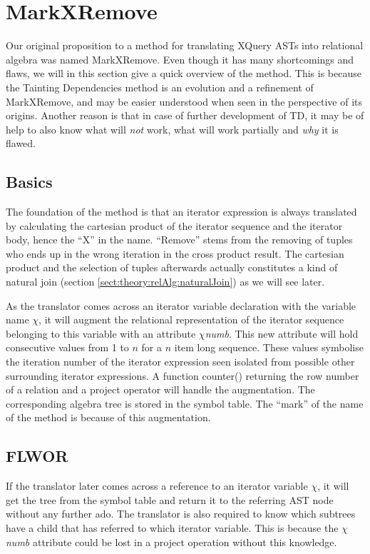 \section{MarkXRemove}
\label{sect:trans:MarkXRemove}

Our original proposition to a method for translating XQuery ASTs into relational algebra was named MarkXRemove.
Even though it has many
shortcomings and flaws, we will in this section give a quick overview of the
method. This is because the Tainting Dependencies method is an evolution
and a refinement of MarkXRemove, and may be easier understood when seen in the perspective of its origins. Another reason is that in case of further development of TD, it may be of help to also know what will
\textit{not} work, what will work partially and \textit{why} it is flawed.

\subsection{Basics}
\label{sect:trans:mxr:basics}

The foundation of the method is that an iterator expression is always translated by calculating the cartesian
product of the iterator sequence and the iterator body, hence the ``X'' in the name. ``Remove'' stems from the
removing of tuples who ends up in the wrong iteration in the cross product
result. The cartesian product and the selection of tuples afterwards actually constitutes a kind of natural join (section
\ref{sect:theory:relAlg:naturalJoin}) as we will see later.

As the translator comes across an iterator variable declaration with the variable name $\chi$, it will augment
the relational representation of the iterator sequence belonging to this variable with an attribute
$\chi$\textit{numb}. This new attribute will hold consecutive values from 1 to $n$ for a $n$ item long sequence.
These values symbolise the iteration number of the iterator expression seen isolated from possible other
surrounding iterator expressions. A function \textsf{counter()} returning the row number of a relation and a
\textsf{project} operator will handle the augmentation. The corresponding algebra tree is stored in the symbol
table. The ``mark'' of the name of the method is because of this augmentation.

\subsection{FLWOR}
\label{sect:trans:mxr:flwor}
If the translator later comes across a reference to an iterator variable $\chi$,
it will get the tree from the symbol table and return it to the referring AST node without any further ado. The
translator is also required to know which subtrees have a child that has referred to which iterator variable. This
is because the $\chi$\textit{numb} attribute could be lost in a \textsf{project} operation without this knowledge.

